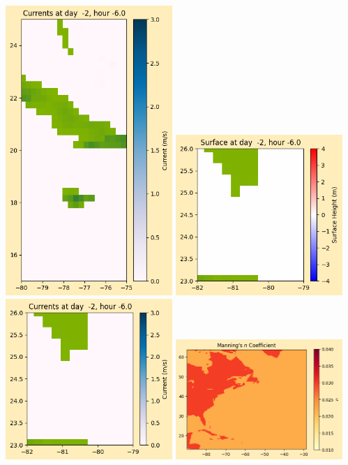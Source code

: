 \documentclass[11pt]{article}
\begin{document}
\includegraphics[width=0.475\textwidth]{frame0003fig1008.png}
\vskip 10pt 
\includegraphics[width=0.475\textwidth]{frame0003fig1009.png}
\includegraphics[width=0.475\textwidth]{frame0003fig1010.png}
\vskip 10pt 
\includegraphics[width=0.475\textwidth]{frame0003fig1011.png}
\end{document}
